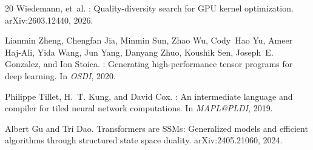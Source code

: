 \documentclass[11pt]{article}
\begin{document}
\begin{thebibliography}{20}
Wiedemann, et~al.
: Quality-diversity search for {GPU} kernel
  optimization.
\newblock arXiv:2603.12440, 2026.

Lianmin Zheng, Chengfan Jia, Minmin Sun, Zhao Wu, Cody~Hao Yu, Ameer
  Haj-Ali, Yida Wang, Jun Yang, Danyang Zhuo, Koushik Sen, Joseph~E. Gonzalez,
  and Ion Stoica.
: Generating high-performance tensor programs for deep
  learning.
\newblock In \emph{OSDI}, 2020.

Philippe Tillet, H.~T. Kung, and David Cox.
: An intermediate language and compiler for tiled neural
  network computations.
\newblock In \emph{MAPL@PLDI}, 2019.

Albert Gu and Tri Dao.
\newblock Transformers are {SSMs}: Generalized models and efficient algorithms
  through structured state space duality.
\newblock arXiv:2405.21060, 2024.

\end{thebibliography}
\end{document}
